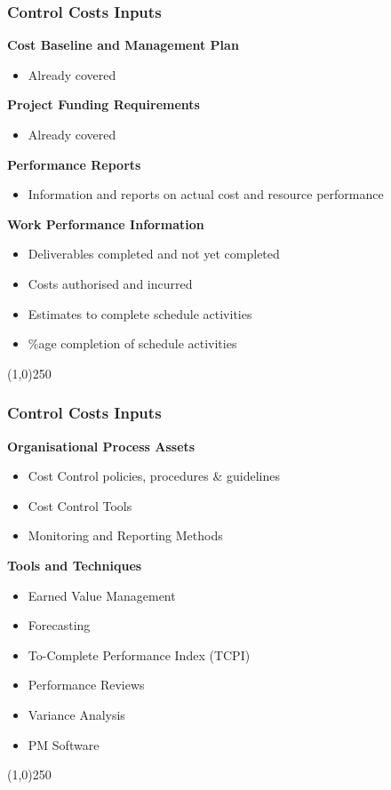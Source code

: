 \begin{frame}
\frametitle{Control Costs \hfill\hfill Inputs}
\textbf{Cost Baseline and Management Plan}\\
\begin{itemize}
	\item Already covered
\end{itemize}
\textbf{Project Funding Requirements}\\
\begin{itemize}
	\item Already covered
\end{itemize}
\textbf{Performance Reports}\\
\begin{itemize}
	\item  Information and reports on actual cost and resource performance
\end{itemize}
\textbf{Work Performance Information}\\
\begin{itemize}
	\item Deliverables completed and not yet completed
	\item Costs authorised and incurred
	\item Estimates to complete schedule activities
	\item \%age completion of schedule activities
\end{itemize}
\end{frame}
\begin{center}\line(1,0){250}\end{center}







\begin{frame}
\frametitle{Control Costs \hfill Inputs}
\textbf{Organisational Process Assets}\\
	\begin{itemize}
		\item Cost Control policies, procedures \& guidelines
		\item Cost Control Tools
		\item Monitoring and Reporting Methods
	\end{itemize}
\textbf{Tools and Techniques}\\
	\begin{itemize}
		\item Earned Value Management
		\item Forecasting
		\item To-Complete Performance Index (TCPI)
		\item Performance Reviews
		\item Variance Analysis
		\item PM Software
	\end{itemize}
\end{frame}
\begin{center}\line(1,0){250}\end{center}






